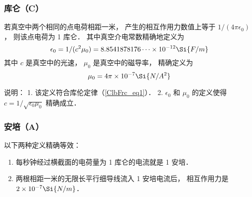 \subsubsection{库仑（C）}
若真空中两个相同的点电荷相距一米， 产生的相互作用力数值上等于 $1/(4\pi\epsilon_0)$， 则该点电荷为 1 库仑． 其中真空介电常数精确地定义为
\begin{equation}
\epsilon_0 = 1/(c^2 \mu_0) = 8.8541878176\dots \times 10^{-12} \Si{F/m}
\end{equation}
其中 $c$ 是真空中的光速， $\mu_0$ 是真空中的磁导率， 精确定义为
\begin{equation}
\mu_0 = 4\pi \times 10^{-7} \Si{N/A^2}
\end{equation}

说明： 1. 该定义符合库伦定律（\autoref{ClbFrc_eq1}）． 2. $\epsilon_0$ 和 $\mu_0$ 的定义使得 $c = 1/\sqrt{\epsilon_0 \mu_0}$ 精确成立．

\subsubsection{安培（A）}
以下两种定义精确等效：
\begin{enumerate}
\item 每秒钟经过横截面的电荷量为 1 库仑的电流就是 1 安培．
\item 两根相距一米的无限长平行细导线流入 1 安培电流后， 相互作用力是 $2 \times 10^{-7}\Si{N/m}$． 
\end{enumerate}
